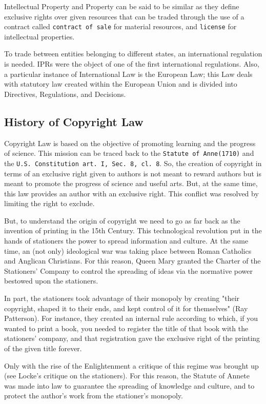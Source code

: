 Intellectual Property and Property can be said to be similar as they define exclusive rights over given resources that can be traded through the use of a contract called \texttt{contract of sale} for material resources, and \texttt{license} for intellectual properties.

To trade between entities belonging to different states, an international regulation is needed. IPRs were the object of one of the first international regulations. Also, a particular instance of International Law is the European Law; this Law deals with statutory law created within the
European Union and is divided into Directives, Regulations, and Decisions.

\subsection*{History of Copyright Law}

Copyright Law is based on the objective of promoting learning and the progress of science. This mission can be traced back to the \texttt{Statute of Anne(1710)} and the \texttt{U.S. Constitution art. I, Sec. 8, cl. 8}. So, the creation of copyright in terms of an exclusive right given to authors is not meant to reward authors but is meant to promote the progress of science and useful arts. But, at the same time, this law provides an author with an exclusive right. This conflict was resolved by limiting the right to exclude.

But, to understand the origin of copyright we need to go as far back as the invention of printing in the 15th Century. This technological revolution put in the hands of stationers the power to spread information and culture. At the same time, an (not only) ideological war was taking place between Roman Catholics and Anglican Christians. For this reason, Queen Mary granted the Charter of the Stationers' Company to control the spreading of ideas via the normative power bestowed upon the stationers.

In part, the stationers took advantage of their monopoly by creating "their copyright, shaped it to their ends, and kept control of it for themselves" (Ray Patterson). For instance, they created an internal rule according to which, if you wanted to print a book, you needed to register the title of that book with the stationers' company, and that registration gave the exclusive right of the printing of the given title forever.

Only with the rise of the Enlightenment a critique of this regime was brought up (see Locke's critique on the stationers). For this reason, the Statute of Annete was made into law to guarantee the spreading of knowledge and culture, and to protect the author's work from the stationer's monopoly.



